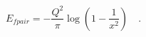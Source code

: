 \begin{equation}
E_{fpair} = -\frac{Q^2}{\pi} \log\left(1-\frac{1}{x^2}\right)\quad.
\label{SymEfpair} \label{SymENeedle}
\end{equation}

